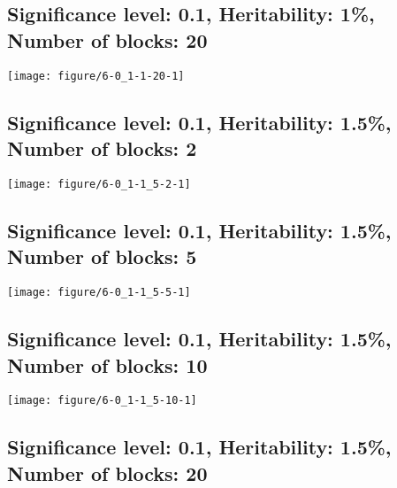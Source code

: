 \documentclass[11pt,letter]{article}\usepackage[]{graphicx}\usepackage[]{color}
\makeatletter
\def\maxwidth{ %
  \ifdim\Gin@nat@width>\linewidth
    \linewidth
  \else
    \Gin@nat@width
  \fi
}
\newenvironment{knitrout}{}{} %
\makeatother
\begin{document}
\newpage
\subsection{Significance level: 0.1, Heritability: 1\%, Number of blocks: 20}

\begin{knitrout}
\color{fgcolor}
\texttt{[image: figure/6-0\_1-1-20-1]} 

\end{knitrout}

\newpage
\subsection{Significance level: 0.1, Heritability: 1.5\%, Number of blocks: 2}

\begin{knitrout}
\color{fgcolor}
\texttt{[image: figure/6-0\_1-1\_5-2-1]} 

\end{knitrout}

\newpage
\subsection{Significance level: 0.1, Heritability: 1.5\%, Number of blocks: 5}

\begin{knitrout}
\color{fgcolor}
\texttt{[image: figure/6-0\_1-1\_5-5-1]} 

\end{knitrout}

\newpage
\subsection{Significance level: 0.1, Heritability: 1.5\%, Number of blocks: 10}

\begin{knitrout}
\color{fgcolor}
\texttt{[image: figure/6-0\_1-1\_5-10-1]} 

\end{knitrout}

\newpage
\subsection{Significance level: 0.1, Heritability: 1.5\%, Number of blocks: 20}
\end{document}
